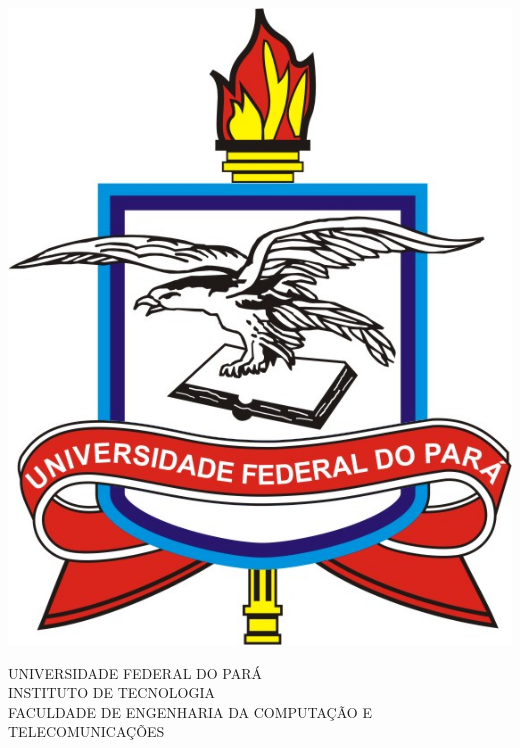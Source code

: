 \documentclass[
	12pt,				%
	openright,			%
	oneside,			%
	a4paper,			%
	english,			%
	brazil				%
	]{abntex2}
\begin{document}

\frenchspacing 


\renewcommand{\imprimircapa}{
\begin{capa}

\center
\includegraphics[scale=0.4]{figures/ufpa_logo.jpg}

 { \ABNTEXchapterfont 
 UNIVERSIDADE FEDERAL DO PARÁ\\
 INSTITUTO DE TECNOLOGIA\\
 FACULDADE DE ENGENHARIA DA COMPUTAÇÃO E TELECOMUNICAÇÕES\\}
   \vspace*{4.0cm}
 
 { \ABNTEXchapterfont\large
   \textbf{\imprimirautor}}
   \vspace*{3.0cm}

 {\ABNTEXchapterfont\LARGE
 \textbf{\imprimirtitulo}}

 \vspace*{\fill}
 {\large\imprimirlocal}
 \par
 {\large\imprimirdata}
 \vspace*{1cm}
\end{capa}
}
\imprimircapa
\end{document}
